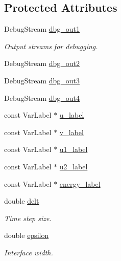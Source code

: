 \subsection*{Protected Attributes}
\begin{DoxyCompactItemize}
\item 
Debug\+Stream \hyperlink{classUintah_1_1PhaseField_1_1Benchmark02_a004f26e78f314bb5fcf0abd83bd5d93e}{dbg\+\_\+out1}
\begin{DoxyCompactList}\small\item\em Output streams for debugging. \end{DoxyCompactList}\item 
Debug\+Stream \hyperlink{classUintah_1_1PhaseField_1_1Benchmark02_ae2aadee6468b7d2f177ae5c990bcba06}{dbg\+\_\+out2}
\item 
Debug\+Stream \hyperlink{classUintah_1_1PhaseField_1_1Benchmark02_ac1725ac89d63b87a843b886fad40a172}{dbg\+\_\+out3}
\item 
Debug\+Stream \hyperlink{classUintah_1_1PhaseField_1_1Benchmark02_a24eec1b88739d1384bc794e00187153a}{dbg\+\_\+out4}
\item 
const Var\+Label $\ast$ \hyperlink{classUintah_1_1PhaseField_1_1Benchmark02_abc26a6dd659ee3be717fee74f7318ecb}{u\+\_\+label}
\item 
const Var\+Label $\ast$ \hyperlink{classUintah_1_1PhaseField_1_1Benchmark02_a34bbefa81a976949d307079736aaf597}{v\+\_\+label}
\item 
const Var\+Label $\ast$ \hyperlink{classUintah_1_1PhaseField_1_1Benchmark02_a783de1b3404d498d0225473c19035ba6}{u1\+\_\+label}
\item 
const Var\+Label $\ast$ \hyperlink{classUintah_1_1PhaseField_1_1Benchmark02_a201ddf875cb5ab90e45b054fcadd2ccd}{u2\+\_\+label}
\item 
const Var\+Label $\ast$ \hyperlink{classUintah_1_1PhaseField_1_1Benchmark02_a4d2ecc4478ebbe38e93dc7f07a065498}{energy\+\_\+label}
\item 
double \hyperlink{classUintah_1_1PhaseField_1_1Benchmark02_a1a3782d2f13c619f5655214569c7b0c6}{delt}
\begin{DoxyCompactList}\small\item\em Time step size. \end{DoxyCompactList}\item 
double \hyperlink{classUintah_1_1PhaseField_1_1Benchmark02_a124c2741d5c879476f7cc139dae053ed}{epsilon}
\begin{DoxyCompactList}\small\item\em Interface width. \end{DoxyCompactList}\end{DoxyCompactItemize}
